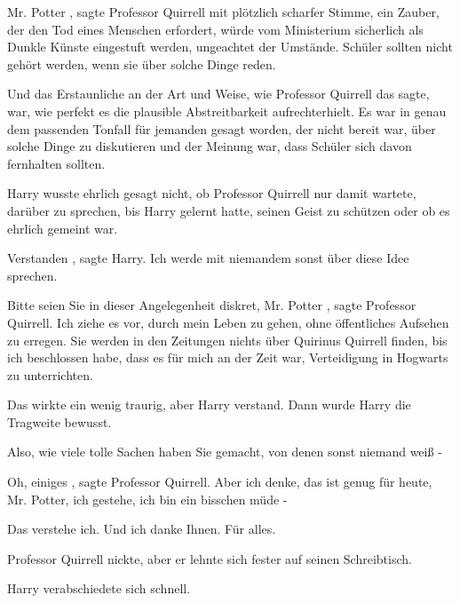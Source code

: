 \glqq Mr. Potter\grqq{} , sagte Professor Quirrell mit plötzlich scharfer
Stimme, \glqq ein Zauber, der den Tod eines Menschen erfordert, würde vom
Ministerium sicherlich als Dunkle Künste eingestuft werden, ungeachtet der
Umstände. Schüler sollten nicht gehört werden, wenn sie über solche Dinge
reden.\grqq{}

Und das Erstaunliche an der Art und Weise, wie Professor Quirrell das sagte,
war, wie perfekt es die plausible Abstreitbarkeit aufrechterhielt. Es war in
genau dem passenden Tonfall für jemanden gesagt worden, der nicht bereit war,
über solche Dinge zu diskutieren und der Meinung war, dass Schüler sich davon
fernhalten sollten.

Harry wusste ehrlich gesagt nicht, ob Professor Quirrell nur damit wartete,
darüber zu sprechen, bis Harry gelernt hatte, seinen Geist zu schützen oder ob
es ehrlich gemeint war.

\glqq Verstanden\grqq{} , sagte Harry. \glqq Ich werde mit niemandem sonst über
diese Idee sprechen.\grqq{}

\glqq Bitte seien Sie in dieser Angelegenheit diskret, Mr. Potter\grqq{} , sagte
Professor Quirrell. \glqq Ich ziehe es vor, durch mein Leben zu gehen, ohne
öffentliches Aufsehen zu erregen. Sie werden in den Zeitungen nichts über
Quirinus Quirrell finden, bis ich beschlossen habe, dass es für mich an der Zeit
war, Verteidigung in Hogwarts zu unterrichten.\grqq{}

Das wirkte ein wenig traurig, aber Harry verstand. Dann wurde Harry die
Tragweite bewusst.

\glqq Also, wie viele tolle Sachen haben Sie gemacht, von denen sonst niemand
weiß -\grqq{}

\glqq Oh, einiges\grqq{} , sagte Professor Quirrell. \glqq Aber ich denke, das
ist genug für heute, Mr. Potter, ich gestehe, ich bin ein bisschen müde -\grqq{}

\glqq Das verstehe ich. Und ich danke Ihnen. Für alles.\grqq{}

Professor Quirrell nickte, aber er lehnte sich fester auf seinen Schreibtisch.

Harry verabschiedete sich schnell.
